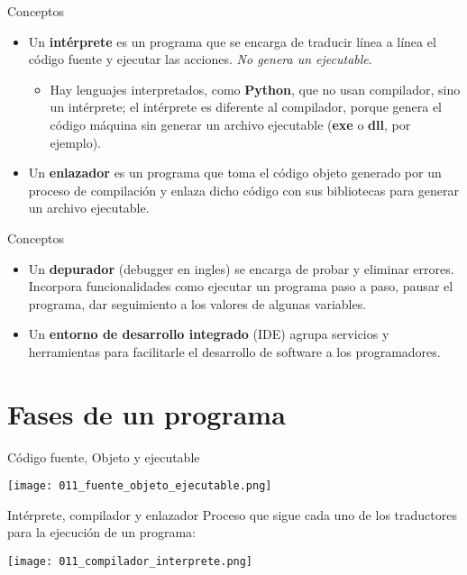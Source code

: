 \begin{frame}[c]{Conceptos}
  \begin{itemize}
    \item Un \textbf{intérprete} es un programa que se encarga de traducir
      línea a línea el código fuente y ejecutar las acciones. \emph{No genera
      un ejecutable}.
      \begin{itemize}
        \item Hay lenguajes interpretados, como \textbf{Python}, que no usan
          compilador, sino un intérprete; el intérprete es diferente al
          compilador, porque genera el código máquina sin generar un archivo
          ejecutable (\textbf{exe} o \textbf{dll}, por ejemplo).
      \end{itemize}
    \pausa
    \item Un \textbf{enlazador} es un programa que toma el código objeto
      generado por un proceso de compilación y enlaza dicho código con sus
      bibliotecas para generar un archivo ejecutable.
  \end{itemize}
\end{frame}

\begin{frame}[c]{Conceptos}
  \begin{itemize}
    \item Un \textbf{depurador} (debugger en ingles) se encarga de probar y
      eliminar errores. Incorpora funcionalidades como ejecutar un programa
      paso a paso, pausar el programa, dar seguimiento a los valores de
      algunas variables.
    \pausa
    \item Un \textbf{entorno de desarrollo integrado} (IDE) agrupa servicios y
      herramientas para facilitarle el desarrollo de software a los
      programadores.
  \end{itemize}
\end{frame}

\section{Fases de un programa}

\begin{frame}[c]{Código fuente, Objeto y ejecutable}
  \begin{center}
    \texttt{[image: 011\_fuente\_objeto\_ejecutable.png]}
  \end{center}
\end{frame}

\begin{frame}[c]{Intérprete, compilador y enlazador}
  Proceso que sigue cada uno de los traductores para la ejecución de un
  programa:
  \begin{center}
    \texttt{[image: 011\_compilador\_interprete.png]}
  \end{center}
\end{frame}

